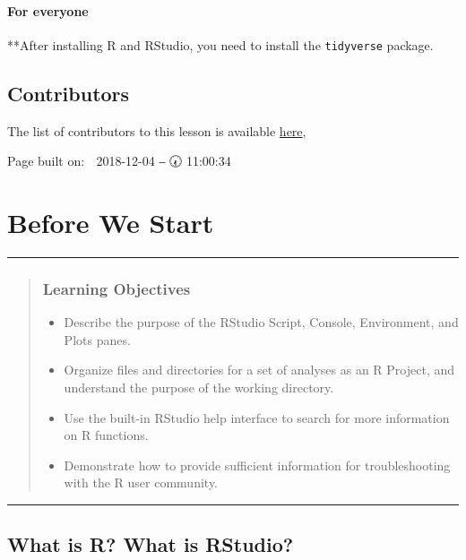 \documentclass[]{book}
\providecommand{\tightlist}{%
  \setlength{\itemsep}{0pt}\setlength{\parskip}{0pt}}
\begin{document}
\subsubsection{For everyone}\label{for-everyone}

**After installing R and RStudio, you need to install the
\texttt{tidyverse} package.

\section{Contributors}\label{contributors}

The list of contributors to this lesson is available
\href{http://datacarpentry.org/R-ecology-lesson/CITATION}{here},

Page built on: 📆 2018-12-04 ‒ 🕢 11:00:34

\chapter{Before We Start}\label{before-we-start}

\begin{center}\rule{0.5\linewidth}{\linethickness}\end{center}

\begin{quote}
\subsection{Learning Objectives}\label{learning-objectives}

\begin{itemize}
\tightlist
\item
  Describe the purpose of the RStudio Script, Console, Environment, and
  Plots panes.
\item
  Organize files and directories for a set of analyses as an R Project,
  and understand the purpose of the working directory.
\item
  Use the built-in RStudio help interface to search for more information
  on R functions.
\item
  Demonstrate how to provide sufficient information for troubleshooting
  with the R user community.
\end{itemize}
\end{quote}

\begin{center}\rule{0.5\linewidth}{\linethickness}\end{center}

\section{What is R? What is RStudio?}\label{what-is-r-what-is-rstudio}
\end{document}
